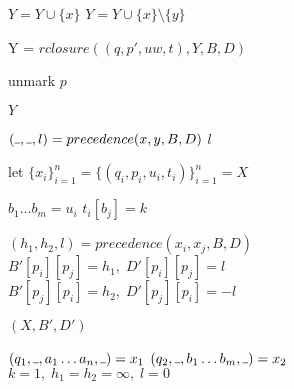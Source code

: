 \documentclass[AMA,STIX1COL]{WileyNJD-v2}
\newcommand{\Xund}{\rule{.4em}{.4pt}}
\begin{document}
\begin{figure*}
\begin{multicols}{2}
\begin{algorithm}[H]
{{        \If {$p \in F \vee \exists (p, \alpha, \Xund, \Xund) \in \Delta^\Sigma$} {
            \If {$\nexists y = (\Xund, p, \Xund, \Xund) \in Y$} {
                $Y = Y \cup \{ x \}$
            }  {
                $Y = Y \cup \{ x \} \setminus \{ y \}$
            }
        }

        \BlankLine
         {
            Y = $rclosure ((q, p', u w, t), Y, B, D)$ \;
        }

        unmark $p$ \;
        }
        \Return $Y$ \;
    }
    \end{algorithm}

    \begin{algorithm}[H] \DontPrintSemicolon {}
     {
        $(\Xund, \Xund, l) = precedence (x, y, B, D)$ \;
        \Return $l$ \;
    }
    \end{algorithm}
\fi


    \begin{algorithm}[H] \DontPrintSemicolon {} 
     {
        let $\{ x_i \}_{i=1}^{n} = \{(q_i, p_i, u_i, t_i) \}_{i=1}^{n} = X$

        \BlankLine
         {
            $b_1 \dots b_m = u_i$ \;
             {
                $t_i[b_j] = k$
            }
        }

        \BlankLine
         {
             {
                $(h_1, h_2, l) = precedence (x_i, x_j, B, D)$ \;
                $B' [p_i] [p_j] = h_1, \; D' [p_i] [p_j] = l$ \;
                $B' [p_j] [p_i] = h_2, \; D' [p_j] [p_i] = -l$ \;
            }
        }

        \BlankLine
        \Return $(X, B', D')$ \;
    }
    \end{algorithm}

    \columnbreak


    \begin{algorithm}[H] \DontPrintSemicolon {}
     {
        $(q_1, \Xund, a_1 \dots a_n, \Xund) = x_1$ \;
        $(q_2, \Xund, b_1 \dots b_m, \Xund) = x_2$ \;
        $k = 1, \; h_1 = h_2 = \infty, \; l = 0$ \;

}
\end{algorithm}
\end{multicols}
\end{figure*}
\end{document}
